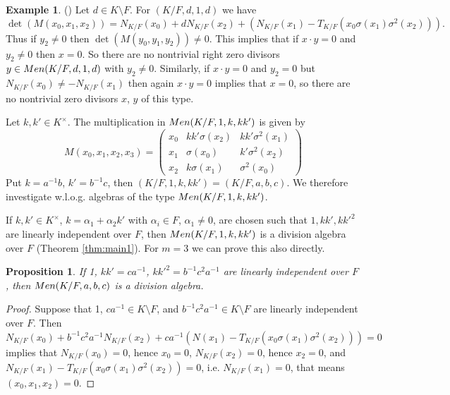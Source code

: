 \documentclass[11pt]{amsart}
\theoremstyle{plain}
\newtheorem{proposition}[theorem]{Proposition}
\theoremstyle{definition}
\newtheorem{example}[theorem]{Example}
\begin{document}
\begin{example} (\cite{ST})
Let $d \in K\setminus F$.
For  $(K/F, d,1,d)$ we have
$$\det(M(x_0,x_1,x_2)) =N_{K/F}(x_0) + d N_{K/F}(x_2)+ (N_{K/F}(x_1)-T_{K/F}(x_0\sigma(x_1)\sigma^2(x_2))).$$
Thus if $y_2\not=0$ then $\det(M(y_0,y_1,y_2)) \not=0$.
This implies that if $x\cdot y=0$ and $y_2\not=0 $ then $x=0$. So there are no nontrivial right zero divisors $y\in {\rm Men}(K/F, d,1,d)$ with $y_2\not=0 $.
Similarly, if $x\cdot y=0$ and $y_2=0 $ but $N_{K/F}(x_0) \not=- N_{K/F}(x_1)$ then again $x\cdot y=0$ implies that $x=0$, so there are no nontrivial zero divisors
$x$, $y$ of this type.
\end{example}





 Let $k,k'\in K^\times$. The multiplication in ${\rm Men}(K/F,1,k,kk')$ is given by
\[M(x_0, x_1, x_2, x_3)=
\left( \begin{array}{ccc}
x_0 &  kk'\sigma(x_2) &   kk'\sigma^2(x_1) \\
x_1     & \sigma(x_0) &   k'\sigma^2(x_2)  \\
x_2    & k\sigma(x_1)& \sigma^2(x_0)
\end{array} \right) \]
Put $k=a^{-1}b$, $k'=b^{-1}c$, then
$(K/F,1,k,kk')=(K/F,a,b,c)$. We therefore investigate w.l.o.g.  algebras of the type ${\rm Men}(K/F,1,k,kk')$.


If $k,k'\in K^\times$, $k=\alpha_1+\alpha_2k'$ with $\alpha_i\in F$, $\alpha_1\not=0$, are chosen such that $1,kk',kk'^2$ are linearly independent over $F$, then
${\rm Men}(K/F,1,k,kk')$ is a division algebra over $F$ (Theorem \ref{thm:main1}). For $m=3$ we can prove this also directly.

\begin{proposition}\label{prop:div}
 If  1, $kk'=ca^{-1}$, $kk'^2=b^{-1}c^2 a^{-1}$ are linearly independent over $F$,
then ${\rm Men}(K/F, a,b,c)$ is a division algebra.
\end{proposition}
\begin{proof}
 Suppose that 1, $ca^{-1}\in K\setminus F$, and $b^{-1}c^2 a^{-1}\in K \setminus F$ are linearly independent over $F$.
Then
$N_{K/F}(x_0) + b^{-1}c^2 a^{-1}N_{K/F}(x_2)+ ca^{-1}(N(x_1)-T_{K/F}(x_0\sigma(x_1)\sigma^2(x_2))) =0$
implies that
$N_{K/F}(x_0)=0$, hence $x_0=0$, $N_{K/F}(x_2)=0$, hence $x_2=0$, and $N_{K/F}(x_1)-T_{K/F}(x_0\sigma(x_1)\sigma^2(x_2))=0$, i.e.
$N_{K/F}(x_1)=0$, that means $(x_0,x_1,x_2)=0$.
\end{proof}
\end{document}
